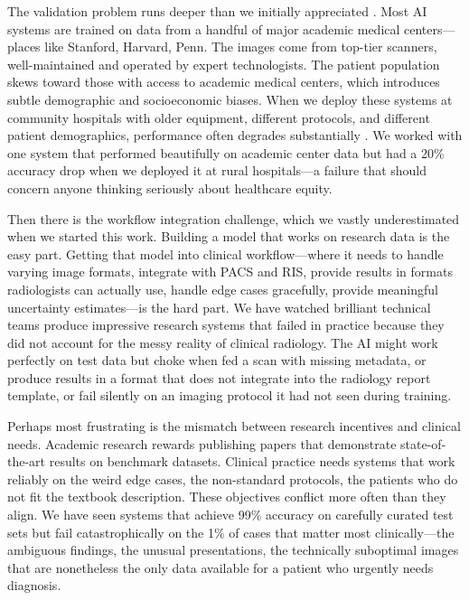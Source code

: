 \documentclass[12pt,a4paper]{article}
\begin{document}
The validation problem runs deeper than we initially appreciated \cite{willemink2020preparing}. Most AI systems are trained on data from a handful of major academic medical centers—places like Stanford, Harvard, Penn. The images come from top-tier scanners, well-maintained and operated by expert technologists. The patient population skews toward those with access to academic medical centers, which introduces subtle demographic and socioeconomic biases. When we deploy these systems at community hospitals with older equipment, different protocols, and different patient demographics, performance often degrades substantially \cite{zhou2021review}. We worked with one system that performed beautifully on academic center data but had a 20\% accuracy drop when we deployed it at rural hospitals—a failure that should concern anyone thinking seriously about healthcare equity.

Then there is the workflow integration challenge, which we vastly underestimated when we started this work. Building a model that works on research data is the easy part. Getting that model into clinical workflow—where it needs to handle varying image formats, integrate with PACS and RIS, provide results in formats radiologists can actually use, handle edge cases gracefully, provide meaningful uncertainty estimates—is the hard part. We have watched brilliant technical teams produce impressive research systems that failed in practice because they did not account for the messy reality of clinical radiology. The AI might work perfectly on test data but choke when fed a scan with missing metadata, or produce results in a format that does not integrate into the radiology report template, or fail silently on an imaging protocol it had not seen during training.

Perhaps most frustrating is the mismatch between research incentives and clinical needs. Academic research rewards publishing papers that demonstrate state-of-the-art results on benchmark datasets. Clinical practice needs systems that work reliably on the weird edge cases, the non-standard protocols, the patients who do not fit the textbook description. These objectives conflict more often than they align. We have seen systems that achieve 99\% accuracy on carefully curated test sets but fail catastrophically on the 1\% of cases that matter most clinically—the ambiguous findings, the unusual presentations, the technically suboptimal images that are nonetheless the only data available for a patient who urgently needs diagnosis.
\end{document}
